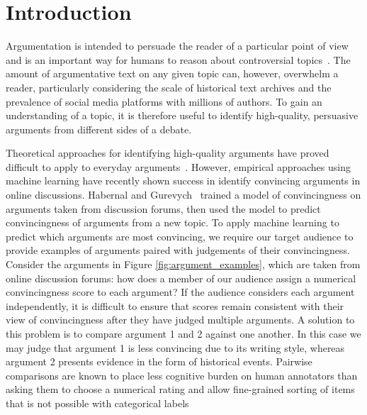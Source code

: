 \section{Introduction}\label{sec:intro}

Argumentation is intended to persuade the reader of a particular point of view and 
is an important way for humans to reason about controversial topics~\cite{mercier2011humans}. 
The amount of argumentative text on any given topic can, however, overwhelm a reader, particularly
considering the scale of historical text archives 
and the prevalence of social media platforms with millions of authors.
To gain an understanding of a topic, it is therefore useful to identify high-quality, 
persuasive arguments from different sides of a debate.

Theoretical approaches for identifying high-quality arguments have proved difficult to apply to everyday arguments~\cite{boudry2015fake}.
However, empirical approaches using machine learning have recently shown success in 
identify convincing arguments in online discussions.
Habernal and Gurevych~ 
trained a model of convincingness on arguments taken from discussion forums, then
used the model to predict convincingness of arguments from a new topic.
To apply machine learning to predict which arguments are most convincing, 
we require our target audience to provide examples of arguments paired with judgements of their convincingness.
Consider the arguments in Figure \ref{fig:argument_examples}, which are taken from online discussion forums:
how does a member of our audience assign a numerical convincingness score to each argument? 
If the audience considers each argument independently, it is difficult to ensure that scores remain
consistent with their view of convincingness after they have judged multiple arguments.
A solution to this problem is to compare argument 1 and 2 against one another. 
In this case we may judge that argument 1 is less convincing due to its writing style, whereas argument 2 
presents evidence in the form of historical events.
Pairwise comparisons are known to place less cognitive burden on human annotators than asking them to 
choose a numerical rating and allow fine-grained sorting of items that is not possible with categorical labels
